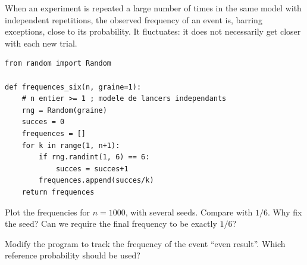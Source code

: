 \begin{keypoint}
When an experiment is repeated a large number of times in the same model with independent repetitions, the observed frequency of an event is, barring exceptions, close to its probability. It fluctuates: it does not necessarily get closer with each new trial.
\end{keypoint}
\begin{lstlisting}
from random import Random

def frequences_six(n, graine=1):
    # n entier >= 1 ; modele de lancers independants
    rng = Random(graine)
    succes = 0
    frequences = []
    for k in range(1, n+1):
        if rng.randint(1, 6) == 6:
            succes = succes+1
        frequences.append(succes/k)
    return frequences
\end{lstlisting}
\begin{example}Plot the frequencies for $n=1000$, with several seeds. Compare with $1/6$. Why fix the seed? Can we require the final frequency to be exactly $1/6$?\end{example}
\begin{example}Modify the program to track the frequency of the event ``even result''. Which reference probability should be used?\end{example}
